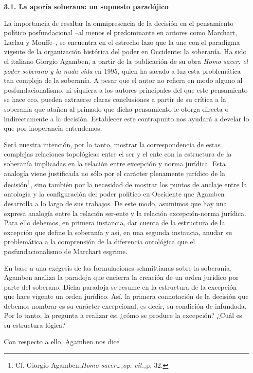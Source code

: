 \documentclass{book}
\begin{document}
\textbf{3.1. La aporía soberana: un supuesto paradójico}

La importancia de resaltar la omnipresencia de la decisión en el
pensamiento político posfundacional --al menos el predominante en
autores como Marchart, Laclau y Mouffe--, se encuentra en el estrecho
lazo que la une con el paradigma vigente de la organización histórica
del poder en Occidente: la soberanía. Ha sido el italiano Giorgio
Agamben, a partir de la publicación de su obra \emph{Homo sacer: el
poder soberano y la nuda vida} en 1995, quien ha sacado a luz esta
problemática tan compleja de la soberanía. A pesar que el autor no
refiera en modo alguno al posfundacionalismo, ni siquiera a los autores
principales del que este pensamiento se hace eco, pueden extraerse
claras conclusiones a partir de su crítica a la soberanía que atañen al
primado que dicho pensamiento le otorga directa o indirectamente a la
decisión. Establecer este contrapunto nos ayudará a develar lo que por
inoperancia entendemos.

Será nuestra intención, por lo tanto, mostrar la correspondencia de
estas complejas relaciones topológicas entre el ser y el ente con la
estructura de la soberanía implicadas en la relación entre excepción y
norma jurídica. Esta analogía viene justificada no sólo por el carácter
plenamente jurídico de la decisión\footnote{Cf. Giorgio
  Agamben,\emph{Homo sacer\ldots,op. cit.,}p. 32.}, sino también por la
necesidad de mostrar los puntos de anclaje entre la ontología y la
configuración del poder político en Occidente que Agamben desarrolla a
lo largo de sus trabajos. De este modo, asumimos que hay una expresa
analogía entre la relación ser-ente y la relación excepción-norma
jurídica. Para ello debemos, en primera instancia, dar cuenta de la
estructura de la excepción que define la soberanía y así, en una segunda
instancia, anudar su problemática a la comprensión de la diferencia
ontológica que el posfundacionalismo de Marchart esgrime.

En base a una exégesis de las formulaciones schmittianas sobre la
soberanía, Agamben analiza la paradoja que encierra la creación de un
orden jurídico por parte del soberano. Dicha paradoja se resume en la
estructura de la excepción que hace vigente un orden jurídico. Así, la
primera connotación de la decisión que debemos nombrar es su carácter
excepcional, es decir, su condición de infundada. Por lo tanto, la
pregunta a realizar es: ¿cómo se produce la excepción? ¿Cuál es su
estructura lógica?

Con respecto a ello, Agamben nos dice
\end{document}
